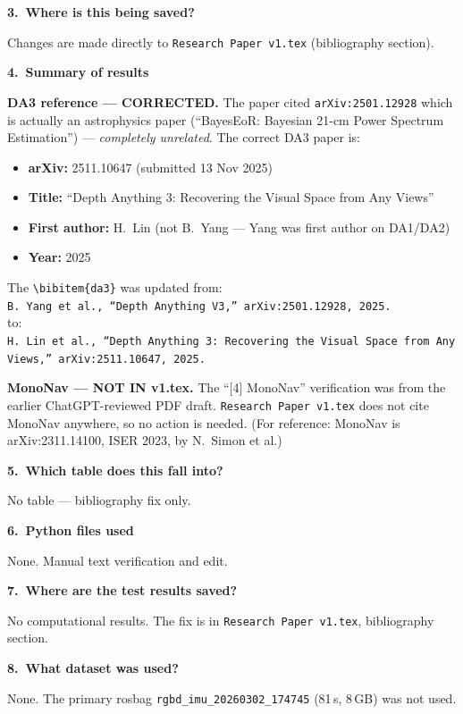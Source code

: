 \documentclass[11pt,a4paper]{article}
\begin{document}
\textbf{3.\ Where is this being saved?}

Changes are made directly to \texttt{Research Paper v1.tex}
(bibliography section).

\textbf{4.\ Summary of results}

\textbf{DA3 reference — CORRECTED.}  The paper cited
\texttt{arXiv:2501.12928} which is actually an astrophysics paper
(``BayesEoR: Bayesian 21-cm Power Spectrum Estimation'') —
\emph{completely unrelated}.  The correct DA3 paper is:

\begin{itemize}
  \item \textbf{arXiv:} 2511.10647 (submitted 13 Nov 2025)
  \item \textbf{Title:} ``Depth Anything 3: Recovering the Visual
    Space from Any Views''
  \item \textbf{First author:} H.~Lin (not B.~Yang — Yang was
    first author on DA1/DA2)
  \item \textbf{Year:} 2025
\end{itemize}

The \texttt{\textbackslash bibitem\{da3\}} was updated from:\\
\texttt{B.~Yang et al., ``Depth Anything V3,''
  arXiv:2501.12928, 2025.}\\
to:\\
\texttt{H.~Lin et al., ``Depth Anything 3: Recovering the Visual
  Space from Any Views,'' arXiv:2511.10647, 2025.}

\textbf{MonoNav — NOT IN v1.tex.}  The ``[4] MonoNav'' verification
was from the earlier ChatGPT-reviewed PDF draft.
\texttt{Research Paper v1.tex} does not cite MonoNav anywhere, so
no action is needed.  (For reference: MonoNav is
arXiv:2311.14100, ISER 2023, by N.~Simon et al.)

\textbf{5.\ Which table does this fall into?}

No table — bibliography fix only.

\textbf{6.\ Python files used}

None.  Manual text verification and edit.

\textbf{7.\ Where are the test results saved?}

No computational results.  The fix is in
\texttt{Research Paper v1.tex}, bibliography section.

\textbf{8.\ What dataset was used?}

None.  The primary rosbag
\texttt{rgbd\_imu\_20260302\_174745} (81\,s, 8\,GB) was not used.
\end{document}
